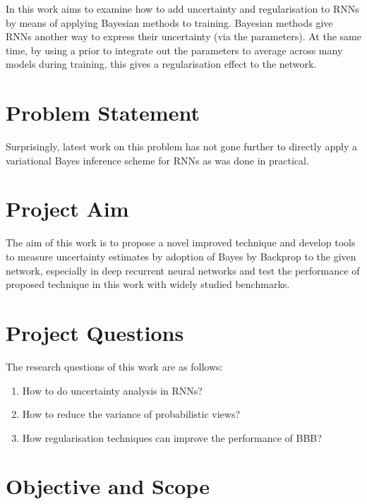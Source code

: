 In this work aims to examine how to add uncertainty and regularisation to RNNs by means of applying Bayesian methods to training.
Bayesian methods give RNNs another way to express their uncertainty (via the parameters).
At the same time, by using a prior to integrate out the parameters to average across many models during training, this gives a regularisation effect to the network.


\section{Problem Statement}

Surprisingly, latest work on this problem has not gone further to directly apply a variational Bayes inference scheme for RNNs as was done in practical.


\section{Project Aim}

The aim of this work is to propose a novel improved technique and develop tools to measure uncertainty estimates by adoption of Bayes by Backprop to the given network, especially in deep recurrent neural networks and test the performance of proposed technique in this work with widely studied benchmarks.

\section{Project Questions}

The research questions of this work are as follows:
\begin{enumerate}
	\item How to do uncertainty analysis in RNNs?
	\item How to reduce the variance of probabilistic views?
	\item How regularisation techniques can improve the performance of BBB?
\end{enumerate}

\section{Objective and Scope}

